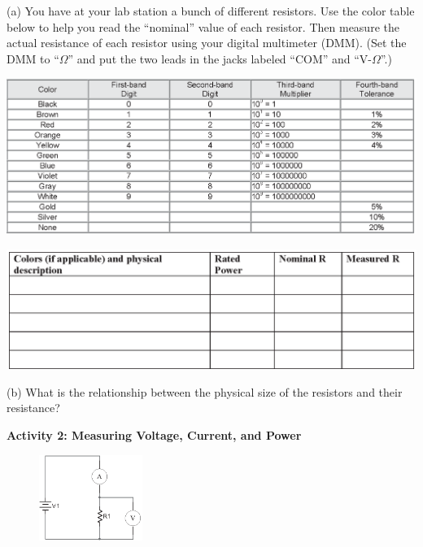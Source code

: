 (a) You have at your lab station a bunch of different resistors.  Use the color table below to help you read the ``nominal'' value of each resistor.  Then measure the actual resistance of each resistor using your digital multimeter (DMM).  (Set the DMM to ``$\Omega$'' and put the two leads in the jacks labeled ``COM'' and ``V-$\Omega$''.)

\begin{center}
\includegraphics[width=1.0\textwidth]{electric_power/color_code.eps}

\vspace{0.2in}
\includegraphics[width=1.0\textwidth]{electric_power/resistor_description.eps}
\end{center}

(b) What is the relationship between the physical size of the resistors and their resistance?
\vspace{1.0in}

\pagebreak
\textbf{Activity 2: Measuring Voltage, Current, and Power}

\begin{figure}
    \vspace{-0.4 in}
    \includegraphics[width=0.3\textwidth]{electric_power/circ_diagram_bw.eps}
\end{figure}

